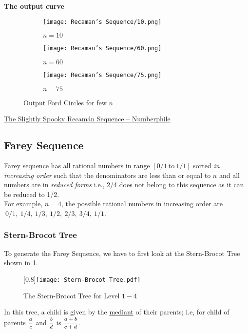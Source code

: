 \textbf{The output curve}
\begin{figure}[H]
	\centering
	\begin{subfigure}{0.3\linewidth}
		\texttt{[image: Recaman's Sequence/10.png]}
		\caption{$n=10$}
	\end{subfigure}
	\begin{subfigure}{0.3\linewidth}
		\texttt{[image: Recaman's Sequence/60.png]}
		\caption{$n=60$}
	\end{subfigure}
	\begin{subfigure}{0.3\linewidth}
		\texttt{[image: Recaman's Sequence/75.png]}
		\caption{$n=75$}
	\end{subfigure}
	\caption{Output Ford Circles for few $n$}
\end{figure}
\begin{funvideo}
	\href{https://youtu.be/FGC5TdIiT9U}{The Slightly Spooky Recamán Sequence -- Numberphile}
\end{funvideo}
\subsection{Farey Sequence}{\label{pp:fareysequence}}
Farey sequence has all rational numbers in range $[0/1\ \text{to}\ 1/1]$ sorted \emph{in increasing order} such that the denominators are less than or equal to $n$ and all numbers are in \emph{reduced forms} i.e., 2/4 does not belong to this sequence as it can be reduced to 1/2.\\
For example, $n=4$, the possible rational numbers in increasing order are $\ 0/1,\ 1/4,\ 1/3,\ 1/2,\ 2/3,\ 3/4,\ 1/1$.
\vspace{-1em}
\subsubsection*{Stern-Brocot Tree}
\vspace{-0.7em}
To generate the Farey Sequence, we have to first look at the {Stern-Brocot Tree} shown in \ref{fig:sternbrocottree}.
\begin{figure}[H]
	\centering
	\scalebox{1}[0.8]{\texttt{[image: Stern-Brocot Tree.pdf]}}
	\caption{The Stern-Brocot Tree for Level $1-4$}
	\label{fig:sternbrocottree}
\end{figure}
In this tree, a child is given by the \href{https://en.wikipedia.org/wiki/Mediant_(mathematics)}{mediant} of their parents; i.e, for child of parents $\mfrac{a}{c}$ and $\mfrac{b}{d}$ is $\mfrac{a+b}{c+d}$.

